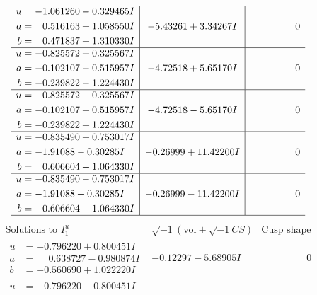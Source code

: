 \documentclass[1p]{elsarticle_modified}
\theoremstyle{definition}
\newcommand{\I}{\sqrt{-1}}
\begin{document}
$$\begin{array}{c|c|c}
\begin{aligned}
u &= -1.061260 - 0.329465 I \\
a &= \phantom{-}0.516163 + 1.058550 I \\
b &= \phantom{-}0.471837 + 1.310330 I\end{aligned}
 & -5.43261 + 3.34267 I & \phantom{-0.000000 } 0 \\ \hline\begin{aligned}
u &= -0.825572 + 0.325567 I \\
a &= -0.102107 - 0.515957 I \\
b &= -0.239822 - 1.224430 I\end{aligned}
 & -4.72518 + 5.65170 I & \phantom{-0.000000 } 0 \\ \hline\begin{aligned}
u &= -0.825572 - 0.325567 I \\
a &= -0.102107 + 0.515957 I \\
b &= -0.239822 + 1.224430 I\end{aligned}
 & -4.72518 - 5.65170 I & \phantom{-0.000000 } 0 \\ \hline\begin{aligned}
u &= -0.835490 + 0.753017 I \\
a &= -1.91088 - 0.30285 I \\
b &= \phantom{-}0.606604 + 1.064330 I\end{aligned}
 & -0.26999 + 11.42200 I & \phantom{-0.000000 } 0 \\ \hline\begin{aligned}
u &= -0.835490 - 0.753017 I \\
a &= -1.91088 + 0.30285 I \\
b &= \phantom{-}0.606604 - 1.064330 I\end{aligned}
 & -0.26999 - 11.42200 I & \phantom{-0.000000 } 0\\
 \hline 
 \end{array}$$\newpage$$\begin{array}{c|c|c}  
\text{Solutions to }I^u_{1}& \I (\text{vol} + \sqrt{-1}CS) & \text{Cusp shape}\\
 \hline 
\begin{aligned}
u &= -0.796220 + 0.800451 I \\
a &= \phantom{-}0.638727 - 0.980874 I \\
b &= -0.560690 + 1.022220 I\end{aligned}
 & -0.12297 - 5.68905 I & \phantom{-0.000000 } 0 \\ \hline\begin{aligned}
u &= -0.796220 - 0.800451 I \\

\end{aligned}
\end{array}$$
\end{document}
